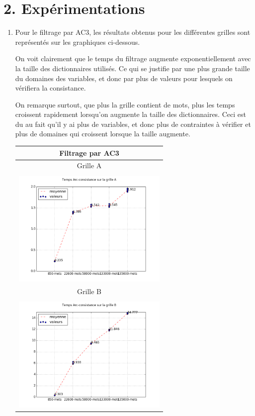 \documentclass[a4paper,12pt]{report}
\begin{document}
\section*{2. Expérimentations}
\begin{enumerate}
\item Pour le filtrage par AC3, les résultats obtenus pour les différentes grilles sont représentés sur les graphiques ci-dessous.

On voit clairement que le temps du filtrage augmente exponentiellement avec la taille des dictionnaires utilisés. Ce qui se justifie par une plus grande taille du domaines des variables, et donc par plus de valeurs pour lesquels on vérifiera la consistance.

On remarque surtout, que plus la grille contient de mots, plus les temps croissent rapidement lorsqu'on augmente la taille des dictionnaires. Ceci est du au fait qu'il y ai plus de variables, et donc plus de contraintes à vérifier et plus de domaines qui croissent lorsque la taille augmente.
\begin{table}[!h]
\begin{center}
\begin{tabular}{|c|}
\hline
 {Filtrage par AC3} \\
\hline
\hline
  Grille A\\
\hline   
   \\
\includegraphics[width=7.5cm]{AC3_A.png}  \\
\hline
Grille B \\
\hline 
\\
\includegraphics[width=7.5cm]{AC3_B.png} \\

\end{tabular}
\end{center}
\end{table}
\end{enumerate}
\end{document}
